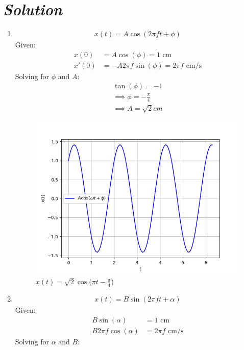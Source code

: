 \documentclass[journal,12pt,twocolumn]{IEEEtran}
\theoremstyle{remark}
\begin{document}
\section*{\textit{\textbf{Solution}}}

\begin{enumerate}
    \item
\begin{align}
   x(t) = A \cos(2\pi f t + \phi)  
\end{align}
Given:
\begin{align}
     x(0)&= A \cos(\phi) = 1 \text{ cm} \\
 x'(0)&= -A 2\pi f \sin(\phi) = 2\pi f \text{ cm/s} \label{eq:3}
 \end{align}
Solving for $\phi$ and $A$:
\begin{align}
    \tan(\phi) = -1\\
\implies
\phi = -\frac{\pi}{4} \\
\implies 
A= \sqrt{2}cm
\end{align}
\begin{figure}[h]
\renewcommand\thefigure{1}
    \centering
    \includegraphics[width=0.8\columnwidth]{figs/fig1.png}
    \caption{$x(t) = \sqrt{2}\cos(\pi t - \frac{\pi}{4}$)}
    \label{Fig1}
\end{figure}
    \item 
\begin{align}
    x(t) = B \sin(2\pi f t + \alpha) 
    \end{align}
    Given:\\
    \begin{align}
     B \sin(\alpha) &= 1 \text{ cm} \\
    B 2\pi f \cos(\alpha) &= 2\pi f \text{ cm/s}\label{eq;11}
\end{align}
Solving for $\alpha$ and $B$:

\end{enumerate}
\end{document}
